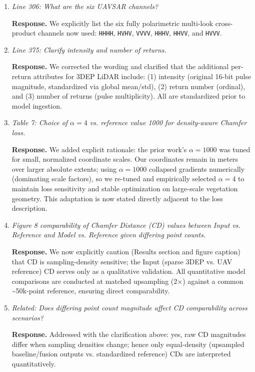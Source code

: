 \documentclass[11pt]{article}
\newcommand{\response}{\textbf{Response.} }
\begin{document}
\begin{enumerate}
  \item \emph{Line 306: What are the six UAVSAR channels?}

  \response We explicitly list the six fully polarimetric multi-look cross-product channels now used: \texttt{HHHH}, \texttt{HVHV}, \texttt{VVVV}, \texttt{HHHV}, \texttt{HHVV}, and \texttt{HVVV}.

  \item \emph{Line 375: Clarify intensity and \emph{number of returns}.}

  \response We corrected the wording and clarified that the additional per-return attributes for 3DEP LiDAR include: (1) intensity (original 16-bit pulse magnitude, standardized via global mean/std), (2) return number (ordinal), and (3) number of returns (pulse multiplicity). All are standardized prior to model ingestion.

  \item \emph{Table 7: Choice of $\alpha=4$ vs. reference value 1000 for density-aware Chamfer loss.}

  \response We added explicit rationale: the prior work’s $\alpha=1000$ was tuned for small, normalized coordinate scales. Our coordinates remain in meters over larger absolute extents; using $\alpha=1000$ collapsed gradients numerically (dominating scale factors), so we re-tuned and empirically selected $\alpha=4$ to maintain loss sensitivity and stable optimization on large-scale vegetation geometry. This adaptation is now stated directly adjacent to the loss description.

  \item \emph{Figure 8 comparability of Chamfer Distance (CD) values between Input vs. Reference and Model vs. Reference given differing point counts.}

  \response We now explicitly caution (Results section and figure caption) that CD is sampling-density sensitive; the Input (sparse 3DEP vs. UAV reference) CD serves only as a qualitative validation. All quantitative model comparisons are conducted at matched upsampling (2×) against a common \textasciitilde50k-point reference, ensuring direct comparability.

  \item \emph{Related: Does differing point count magnitude affect CD comparability across scenarios?}

  \response Addressed with the clarification above: yes, raw CD magnitudes differ when sampling densities change; hence only equal-density (upsampled baseline/fusion outputs vs. standardized reference) CDs are interpreted quantitatively.


\end{enumerate}
\end{document}
